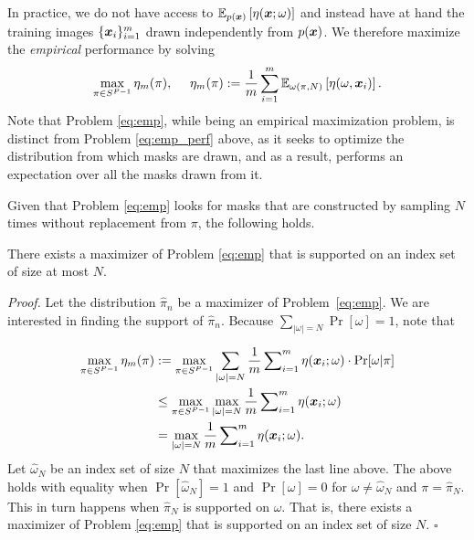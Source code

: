 In practice, we do not have access to $\mathbb{E}_{p({\bm{x}})} \left[\eta({\bm{x}}; \omega)\right]$ and instead have at hand the training images $\{{\bm{x}}_i\}_{i=1}^m$ drawn independently from $p({\bm{x}})$. We therefore maximize the \textit{empirical} performance by solving \useshortskip
\begin{equation}
\label{eq:emp}
\max_{\pi\in S^{P-1}}  \eta_m(\pi), \text{~~~~} \eta_m(\pi) :=\frac{1}{m} \sum_{i=1}^m \mathbb{E}_{\omega(\pi,N)}\left[\eta(\omega,{\bm{x}}_i)\right].
 \end{equation}\useshortskip 
Note that Problem \ref{eq:emp}, while being an empirical maximization problem, is distinct from Problem \ref{eq:emp_perf} above, as it seeks to optimize the distribution from which masks are drawn, and as a result, performs an expectation over all the masks drawn from it.

Given that Problem \ref{eq:emp} looks for  masks that are constructed by sampling $N$ times without replacement from $\pi$, the following holds.
\begin{proposition}
There exists a maximizer of Problem \ref{eq:emp} that is supported on an index set of size at most $N$.\label{prop:1}

{\normalfont \noindent \textit{Proof.}  Let the distribution $\widehat{\pi}_n$ be a maximizer of Problem~\ref{eq:emp}. We are interested in finding the support of $\widehat{\pi}_n$. Because $\sum_{|\omega|=N}\Pr[\omega]=1$, note that 

    \begin{align}
    \max_{\pi\in S^{P-1}}  \eta_m(\pi) & := \max_{\pi\in S^{P-1}}  \sum_{|\omega|=N}  \frac{1}{m}\sum\nolimits_{i=1}^m\eta({\bm{x}}_{i};\omega) \cdot \Pr[\omega|\pi]\nonumber\\ 
    & \le \max_{\pi\in S^{P-1}} \max_{|\omega|=N} \frac{1}{m}\sum\nolimits_{i=1}^m\eta({\bm{x}}_{i}; \omega) \nonumber\\
    & = \max_{|\omega|=N}   \frac{1}{m}\sum\nolimits_{i=1}^m\eta({\bm{x}}_{i};\omega).  \nonumber
    \end{align}
    Let $\widehat{\omega}_N$ be an index set of size $N$ that maximizes the last line above. 
    The above holds with equality when $\Pr[\widehat{\omega}_N]=1$ and $\Pr[\omega]=0$ for $\omega\ne \widehat{\omega}_N$ and $\pi=\widehat{\pi}_N$. This in turn happens when $\widehat{\pi}_N$ is  supported on $\widehat{\omega}$. That is, there exists a maximizer of Problem \ref{eq:emp} that is supported on an index set of size $N$. \hfill $\square$}
\end{proposition}

